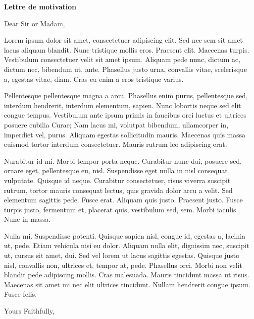 \documentclass{moderncover}
\begin{document}
  \maketitle

  \begin{letter}{\textbf{Lettre de motivation}}
    \opening{Dear Sir or Madam,}

\indent Lorem ipsum dolor sit amet, consectetuer adipiscing elit. Sed nec sem sit amet
lacus aliquam blandit. Nunc tristique mollis eros. Praesent elit. Maecenas turpis.
Vestibulum consectetuer velit sit amet ipsum. Aliquam pede nunc, dictum ac,
dictum nec, bibendum ut, ante. Phasellus justo urna, convallis vitae, scelerisque
a, egestas vitae, diam. Cras eu enim a eros tristique varius.

\indent Pellentesque pellentesque magna a arcu. Phasellus enim purus, pellentesque sed,
interdum hendrerit, interdum elementum, sapien. Nunc lobortis neque sed elit
congue tempus. Vestibulum ante ipsum primis in faucibus orci luctus et ultrices
posuere cubilia Curae; Nam lacus mi, volutpat bibendum, ullamcorper in,
imperdiet vel, purus. Aliquam egestas sollicitudin mauris. Maecenas quis massa
euismod tortor interdum consectetuer. Mauris rutrum leo adipiscing erat.

\indent Nurabitur id mi. Morbi tempor porta neque. Curabitur nunc dui, posuere sed,
ornare eget, pellentesque eu, nisl. Suspendisse eget nulla in nisl consequat
vulputate. Quisque id neque. Curabitur consectetuer, risus viverra suscipit
rutrum, tortor mauris consequat lectus, quis gravida dolor arcu a velit. Sed
elementum sagittis pede. Fusce erat. Aliquam quis justo. Praesent justo. Fusce
turpis justo, fermentum et, placerat quis, vestibulum sed, sem. Morbi iaculis.
Nunc in massa.

\indent Nulla mi. Suspendisse potenti. Quisque sapien nisl, congue id, egestas a, lacinia
ut, pede. Etiam vehicula nisi eu dolor. Aliquam nulla elit, dignissim nec, suscipit
ut, cursus sit amet, dui. Sed vel lorem ut lacus sagittis egestas. Quisque justo
nisl, convallis non, ultrices et, tempor at, pede. Phasellus orci. Morbi non velit
blandit pede adipiscing mollis. Cras malesuada. Mauris tincidunt massa ut risus.
Maecenas sit amet mi nec elit ultrices tincidunt. Nullam hendrerit congue ipsum.
Fusce felis.

    \closing{Yours Faithfully,}
  \end{letter}
\end{document}
